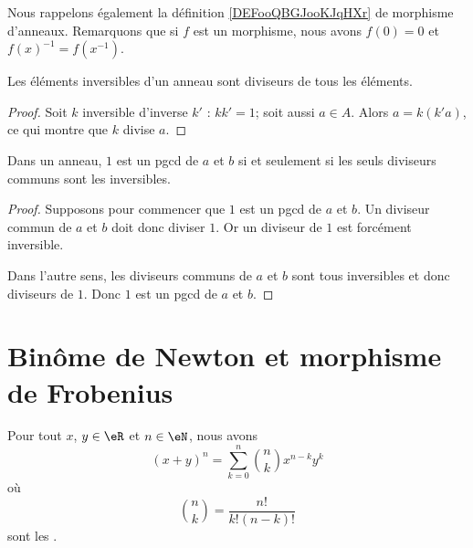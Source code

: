 Nous rappelons également la définition \ref{DEFooQBGJooKJqHXr} de morphisme d'anneaux. Remarquons que si \( f\) est un morphisme, nous avons \( f(0)=0\) et \( f(x)^{-1}=f(x^{-1})\).

\begin{lemma}
    Les éléments inversibles d'un anneau sont diviseurs de tous les éléments.
\end{lemma}

\begin{proof}
    Soit \( k\) inversible d'inverse \( k'\) : \( kk'=1\); soit aussi \( a\in A\). Alors \( a=k(k'a)\), ce qui montre que \( k\) divise \( a\).
\end{proof}

\begin{lemma}
    Dans un anneau, \( 1\) est un pgcd de \( a\) et \( b\) si et seulement si les seuls diviseurs communs sont les inversibles.
\end{lemma}

\begin{proof}
    Supposons pour commencer que \( 1\) est un pgcd de \( a\) et \( b\). Un diviseur commun de \( a\) et \( b\) doit donc diviser \( 1\). Or un diviseur de \( 1\) est forcément inversible.

    Dans l'autre sens, les diviseurs communs de \( a\) et \( b\) sont tous inversibles et donc diviseurs de \( 1\). Donc \( 1\) est un pgcd de \( a\) et \( b\).
\end{proof}

\section{Binôme de Newton et morphisme de Frobenius}

\begin{proposition}     \label{PropBinomFExOiL}
Pour tout $x$, $y\in\eR$ et $n\in\eN$, nous avons
\begin{equation}        \label{EqNewtonB}
    (x+y)^n=\sum_{k=0}^n{n\choose k}x^{n-k}y^k
\end{equation}
où
\begin{equation}
    {n\choose k}=\frac{ n! }{ k!(n-k)! }
\end{equation}
sont les .
\end{proposition}


